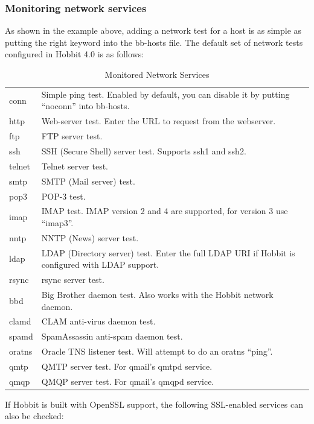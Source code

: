 \subsubsection{Monitoring network services}


 As shown in the example above, adding a network test for a host is as
 simple as putting the right keyword into the bb-hosts file. The
 default set of network tests configured in Hobbit 4.0 is as follows:

\begin{table} \centering \caption{Monitored Network Services} \label{Monitored_Network_Services}
\begin{tabular}{l|l}
conn & Simple ping test. Enabled by default, you can disable it by putting ``noconn'' into bb-hosts.\\
http & Web-server test. Enter the URL to request from the webserver. \\
ftp & FTP server test. \\
ssh & SSH (Secure Shell) server test. Supports ssh1 and ssh2. \\
telnet & Telnet server test. \\
smtp & SMTP (Mail server) test.\\ 
pop3 & POP-3 test. \\
imap & IMAP test. IMAP version 2 and 4 are supported, for version 3 use ``imap3''. \\
nntp & NNTP (News) server test. \\
ldap & LDAP (Directory server) test. Enter the full LDAP URI if Hobbit is configured with LDAP support. \\
rsync & rsync server test. \\
bbd & Big Brother daemon test. Also works with the Hobbit network daemon. \\
clamd & CLAM anti-virus daemon test. \\
spamd & SpamAssassin anti-spam daemon test. \\
oratns & Oracle TNS listener test. Will attempt to do an oratns ``ping''. \\
qmtp & QMTP server test. For qmail's qmtpd service. \\
qmqp & QMQP server test. For qmail's qmqpd service.
\end{tabular}

\end{table}

 If Hobbit is built with OpenSSL support, the following SSL-enabled services can also be checked:

